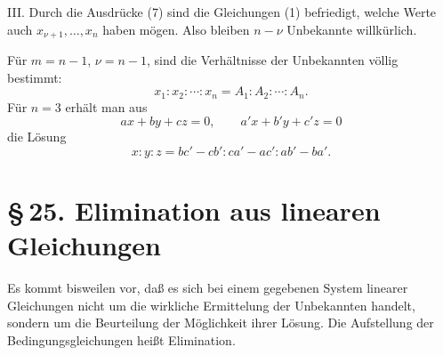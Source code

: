 \documentclass[11pt]{article}
\begin{document}
III. Durch die Ausdrücke (7) sind die Gleichungen (1) befriedigt, welche Werte auch \(x_{\nu+1},\ldots,x_n\) haben mögen.  Also bleiben \(n-\nu\) Unbekannte willkürlich.

Für \(m=n-1\), \(\nu=n-1\), sind die Verhältnisse der Unbekannten völlig bestimmt:
\begin{equation}
        x_1:x_2:\cdots:x_n=A_1:A_2:\cdots:A_n.
\tag{16}
\end{equation}
Für \(n=3\) erhält man aus
\begin{equation}
        ax+by+cz=0,
        \qquad a'x+b'y+c'z=0
\tag{17}
\end{equation}
die Lösung
\begin{equation}
        x:y:z=bc'-cb':ca'-ac':ab'-ba'.
\tag{18}
\end{equation}

\section*{\S\,25. Elimination aus linearen Gleichungen}

Es kommt bisweilen vor, daß es sich bei einem gegebenen System linearer Gleichungen nicht um die wirkliche Ermittelung der Unbekannten handelt, sondern um die Beurteilung der Möglichkeit ihrer Lösung.  Die Aufstellung der Bedingungsgleichungen heißt Elimination.
\end{document}
